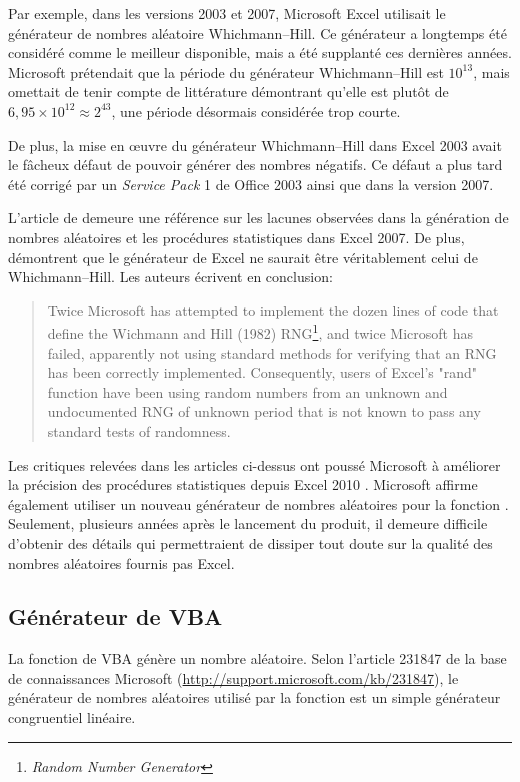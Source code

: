 Par exemple, dans les versions 2003 et 2007, Microsoft Excel utilisait
le générateur de nombres aléatoire Whichmann--Hill. Ce générateur a
longtemps été considéré comme le meilleur disponible, mais a été
supplanté ces dernières années. Microsoft prétendait que la période du
générateur Whichmann--Hill est $10^{13}$, mais omettait de tenir
compte de littérature démontrant qu'elle est plutôt de $6,95 \times
10^{12} \approx 2^{43}$, une période désormais considérée trop courte.

De plus, la mise en {\oe}uvre du générateur Whichmann--Hill dans Excel
2003 avait le fâcheux défaut de pouvoir générer des nombres négatifs.
Ce défaut a plus tard été corrigé par un \emph{Service Pack} 1 de
Office 2003 ainsi que dans la version 2007.

L'article de \cite{McCullough:Excel2007:2008} demeure une référence
sur les lacunes observées dans la génération de nombres aléatoires et
les procédures statistiques dans Excel 2007. De plus,
\citet{McCullough:MENTWH:2008} démontrent que le générateur de Excel
ne saurait être véritablement celui de Whichmann--Hill. Les auteurs
écrivent en conclusion:
\begin{quote}
  Twice Microsoft has attempted to implement the dozen lines of code
  that define the Wichmann and Hill (1982) RNG\footnote{%
    \emph{Random Number Generator}}, %
  and twice Microsoft has failed, apparently not using standard
  methods for verifying that an RNG has been correctly implemented.
  Consequently, users of Excel's "rand" function have been using
  random numbers from an unknown and undocumented RNG of unknown
  period that is not known to pass any standard tests of randomness.
\end{quote}

Les critiques relevées dans les articles ci-dessus ont poussé
Microsoft à améliorer la précision des procédures statistiques depuis
Excel 2010 \citep{Microsoft:Excel2010:2009}. Microsoft affirme
également utiliser un nouveau générateur de nombres aléatoires pour la
fonction . Seulement, plusieurs années après le lancement
du produit, il demeure difficile d'obtenir des détails qui
permettraient de dissiper tout doute sur la qualité des nombres
aléatoires fournis pas Excel.


\subsection{Générateur de VBA}

La fonction  de VBA génère un nombre aléatoire. Selon
l'article 231847 de la base de connaissances Microsoft
(\url{http://support.microsoft.com/kb/231847}), le générateur de
nombres aléatoires utilisé par la fonction  est un simple
générateur congruentiel linéaire.

